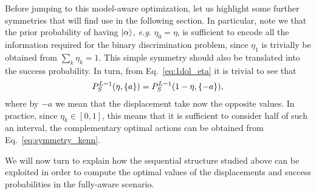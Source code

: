 Before jumping to this model-aware optimization, let us highlight some further symmetries that will find use in the following section. In particular, note we that the prior probability of having $\ket{\alpha}$, \textit{e.g.} $\eta_0 = \eta$, is sufficient to encode all the information required for the binary discrimination problem, since $\eta_1$ is trivially be obtained from $\sum_k\eta_k=1$. This simple symmetry should also be translated into the success probability. In turn, from Eq.~\ref{eq:1dol_eta} it is trivial to see that
\begin{align}\label{eq:symmetry_kenn}
P_S^{L=1}(\eta, \lbrace a\rbrace) =  P_S^{L=1}(1-\eta, \lbrace -a\rbrace),
\end{align}
where by $-a$ we mean that the displacement take now the opposite values. In practice, since $\eta_k \in[0,1]$, this means that it is sufficient to consider half of such an interval, the complementary optimal actions can be obtained from Eq.~\ref{eq:symmetry_kenn}.

We will now turn to explain how the sequential structure studied above can be exploited in order to compute the optimal values of the displacements and success probabilities in the fully-aware scenario.
